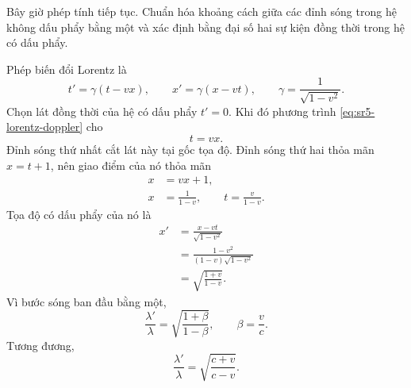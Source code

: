 \begin{classroomqa}
\end{classroomqa}

\begin{classroomqa}
\end{classroomqa}

Bây giờ phép tính tiếp tục. Chuẩn hóa khoảng cách giữa các đỉnh sóng trong hệ không dấu phẩy bằng một và xác định bằng đại số hai sự kiện đồng thời trong hệ có dấu phẩy.

Phép biến đổi Lorentz là
\begin{equation}
t'=\gamma(t-vx),
\qquad
x'=\gamma(x-vt),
\qquad
\gamma=\frac{1}{\sqrt{1-v^2}}.
\label{eq:sr5-lorentz-doppler}
\end{equation}
Chọn lát đồng thời của hệ có dấu phẩy \(t'=0\). Khi đó phương trình
\eqref{eq:sr5-lorentz-doppler} cho
\begin{equation}
t=vx.
\label{eq:sr5-primed-simultaneity}
\end{equation}
Đỉnh sóng thứ nhất cắt lát này tại gốc tọa độ. Đỉnh sóng thứ hai thỏa mãn
\(x=t+1\), nên giao điểm của nó thỏa mãn
\begin{align}
x&=vx+1,\\
x&=\frac{1}{1-v},
\qquad
t=\frac{v}{1-v}.
\end{align}
Tọa độ có dấu phẩy của nó là
\begin{align}
x'
&=\frac{x-vt}{\sqrt{1-v^2}}\\
&=\frac{1-v^2}{(1-v)\sqrt{1-v^2}}\\
&=\sqrt{\frac{1+v}{1-v}}.
\end{align}
Vì bước sóng ban đầu bằng một,
\begin{equation}
\boxed{
\frac{\lambda'}{\lambda}
=
\sqrt{\frac{1+\beta}{1-\beta}}
},
\qquad
\beta=\frac{v}{c}.
\label{eq:sr5-doppler}
\end{equation}
Tương đương,
\begin{equation}
\frac{\lambda'}{\lambda}
=
\sqrt{\frac{c+v}{c-v}}.
\end{equation}

